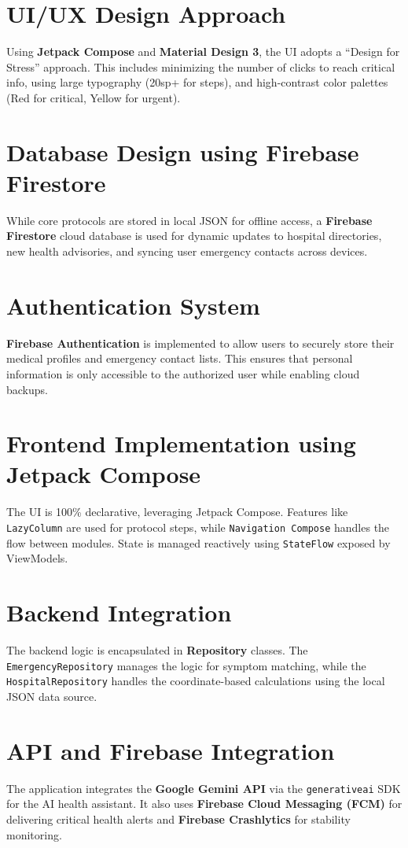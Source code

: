 \documentclass[12pt,a4paper]{report}
\begin{document}
\section{UI/UX Design Approach}
Using \textbf{Jetpack Compose} and \textbf{Material Design 3}, the UI adopts a ``Design for Stress'' approach. This includes minimizing the number of clicks to reach critical info, using large typography (20sp+ for steps), and high-contrast color palettes (Red for critical, Yellow for urgent).

\section{Database Design using Firebase Firestore}
While core protocols are stored in local JSON for offline access, a \textbf{Firebase Firestore} cloud database is used for dynamic updates to hospital directories, new health advisories, and syncing user emergency contacts across devices.

\section{Authentication System}
\textbf{Firebase Authentication} is implemented to allow users to securely store their medical profiles and emergency contact lists. This ensures that personal information is only accessible to the authorized user while enabling cloud backups.

\section{Frontend Implementation using Jetpack Compose}
The UI is 100\% declarative, leveraging Jetpack Compose. Features like \texttt{LazyColumn} are used for protocol steps, while \texttt{Navigation Compose} handles the flow between modules. State is managed reactively using \texttt{StateFlow} exposed by ViewModels.

\section{Backend Integration}
The backend logic is encapsulated in \textbf{Repository} classes. The \texttt{EmergencyRepository} manages the logic for symptom matching, while the \texttt{HospitalRepository} handles the coordinate-based calculations using the local JSON data source.

\section{API and Firebase Integration}
The application integrates the \textbf{Google Gemini API} via the \texttt{generativeai} SDK for the AI health assistant. It also uses \textbf{Firebase Cloud Messaging (FCM)} for delivering critical health alerts and \textbf{Firebase Crashlytics} for stability monitoring.
\end{document}
